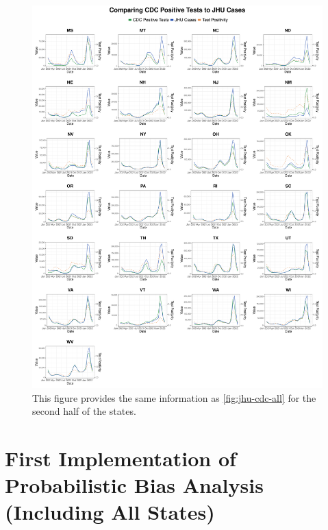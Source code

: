 \documentclass[12pt,twoside]{smiththesis}
\begin{document}
\begin{figure}

{\centering \includegraphics[width=1\linewidth]{figure/jhu_cdc_all_states_2} 

}

\caption{\label{fig:jhu-cdc-all2} This figure provides the same information as \ref{fig:jhu-cdc-all} for the second half of the states.}\label{fig:unnamed-chunk-115}
\end{figure}
\hypertarget{first-implementation-of-probabilistic-bias-analysis-including-all-states}{%
\section{First Implementation of Probabilistic Bias Analysis (Including All States)}\label{first-implementation-of-probabilistic-bias-analysis-including-all-states}}
\end{document}
